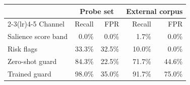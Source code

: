 \begin{tabular}{lrrrr}
\toprule
& \multicolumn{2}{c}{Probe set} & \multicolumn{2}{c}{External corpus} \\
\cmidrule(lr){2-3}\cmidrule(lr){4-5}
Channel & Recall & FPR & Recall & FPR \\
\midrule
Salience score band & 0.0\% & 0.0\% & 1.7\% & 0.0\% \\
Risk flags & 33.3\% & 32.5\% & 10.0\% & 0.0\% \\
Zero-shot guard & 84.3\% & 22.5\% & 71.7\% & 44.6\% \\
Trained guard & 98.0\% & 35.0\% & 91.7\% & 75.0\% \\
\bottomrule
\end{tabular}
